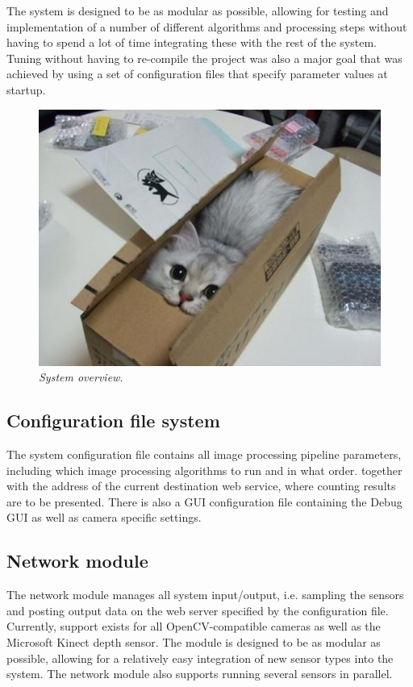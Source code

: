 The system is designed to be as modular as possible, allowing for testing and implementation of a number of different algorithms and processing steps without having to spend a lot of time integrating these with the rest of the system. Tuning without having to re-compile the project was also a major goal that was achieved by using a set of configuration files that specify parameter values at startup.


\begin{figure}[htb]
	\centering
	\includegraphics[width=\linewidth]{images/boxcat.jpg}
	\caption[Overview of the entire system]{\textit{System overview.}}
	\label{fig:system_overview}  %
\end{figure}

\subsection{Configuration file system}
The system configuration file contains all image processing pipeline parameters, including which image processing algorithms to run and in what order. together with the address of the current destination web service, where counting results are to be presented. There is also a GUI configuration file containing the Debug GUI as well as camera specific settings. 

\subsection{Network module}
The network module manages all system input/output, i.e. sampling the sensors and posting output data on the web server specified by the configuration file. Currently, support exists for all OpenCV-compatible cameras as well as the Microsoft Kinect depth sensor. The module is designed to be as modular as possible, allowing for a relatively easy integration of new sensor types into the system. The network module also supports running several sensors in parallel. 

